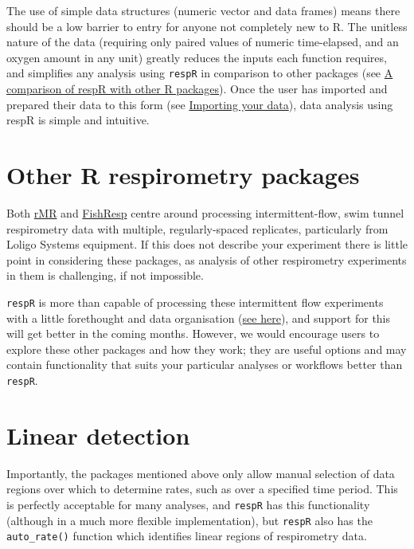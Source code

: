 \documentclass[]{book}
\begin{document}
The use of simple data structures (numeric vector and data frames) means
there should be a low barrier to entry for anyone not completely new to
R. The unitless nature of the data (requiring only paired values of
numeric time-elapsed, and an oxygen amount in any unit) greatly reduces
the inputs each function requires, and simplifies any analysis using
\texttt{respR} in comparison to other packages (see
\href{https://januarharianto.github.io/respR/articles/packages_comp.html}{A
comparison of respR with other R packages}). Once the user has imported
and prepared their data to this form (see
\href{https://januarharianto.github.io/respR/articles/importing.html}{Importing
your data}), data analysis using respR is simple and intuitive.

\section{Other R respirometry
packages}\label{other-r-respirometry-packages}

Both \href{https://cran.r-project.org/web/packages/rMR/index.html}{rMR}
and \href{https://fishresp.org}{FishResp} centre around processing
intermittent-flow, swim tunnel respirometry data with multiple,
regularly-spaced replicates, particularly from Loligo Systems equipment.
If this does not describe your experiment there is little point in
considering these packages, as analysis of other respirometry
experiments in them is challenging, if not impossible.

\texttt{respR} is more than capable of processing these intermittent
flow experiments with a little forethought and data organisation
(\href{https://januarharianto.github.io/respR/articles/intermittent2.html}{see
here}), and support for this will get better in the coming months.
However, we would encourage users to explore these other packages and
how they work; they are useful options and may contain functionality
that suits your particular analyses or workflows better than
\texttt{respR}.

\section{Linear detection}\label{linear-detection}

Importantly, the packages mentioned above only allow manual selection of
data regions over which to determine rates, such as over a specified
time period. This is perfectly acceptable for many analyses, and
\texttt{respR} has this functionality (although in a much more flexible
implementation), but \texttt{respR} also has the \texttt{auto\_rate()}
function which identifies linear regions of respirometry data.
\end{document}
